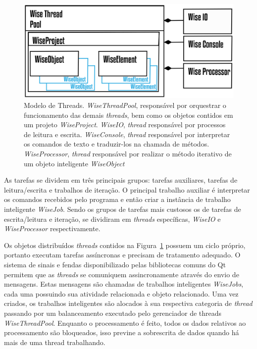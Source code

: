 \begin{figure}[!htbp]
	\centering
	\includegraphics[width=\linewidth]{Figures/WiseThreadPool@16x.png}
	\caption{Modelo de Threads. \textit{WiseThreadPool}, responsável por orquestrar o funcionamento das demais \textit{threads}, bem como os objetos contidos em um projeto \textit{WiseProject}. \textit{WiseIO}, \textit{thread} responsável por processos de leitura e escrita. \textit{WiseConsole}, \textit{thread} responsável por interpretar os comandos de texto e traduzir-los na chamada de métodos. \textit{WiseProcessor}, \textit{thread} responsável por realizar o método iterativo de um objeto inteligente \textit{WiseObject}}
	\label{fig7:threads}
\end{figure}

As tarefas se dividem em três principais grupos: tarefas auxiliares, tarefas de leitura/escrita e trabalhos de iteração. O principal trabalho auxiliar é interpretar os comandos recebidos pelo programa e então criar a instância de trabalho inteligente \textit{WiseJob}. Sendo os grupos de tarefas mais custosos os de tarefas de escrita/leitura e iteração, se dividiram em \textit{threads} específicas, \textit{WiseIO} e \textit{WiseProcessor} respectivamente.

Os objetos distribuídos \textit{threads} contidos na Figura~\ref{fig7:threads} possuem um ciclo próprio, portanto executam tarefas assíncronas e precisam de tratamento adequado. O sistema de sinais e fendas disponibilizado pelas bibliotecas comuns do Qt permitem que as \textit{threads} se comuniquem assincronamente através do envio de mensagens. Estas mensagens são chamadas de trabalhos inteligentes \textit{WiseJobs}, cada uma possuindo sua atividade relacionada e objeto relacionado. Uma vez criados, os trabalhos inteligentes são alocados à sua respectiva categoria de \textit{thread} passando por um balanceamento executado pelo gerenciador de threads \textit{WiseThreadPool}. Enquanto o processamento é feito, todos os dados relativos ao processamento são bloqueados, isso previne a sobrescrita de dados quando há mais de uma thread trabalhando.

